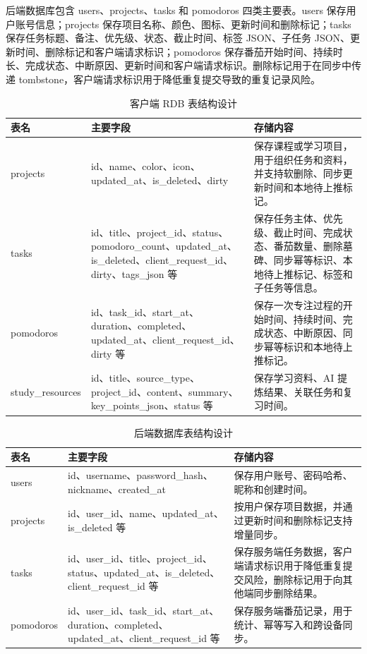 后端数据库包含 users、projects、tasks 和 pomodoros 四类主要表。users 保存用户账号信息；projects 保存项目名称、颜色、图标、更新时间和删除标记；tasks 保存任务标题、备注、优先级、状态、截止时间、标签 JSON、子任务 JSON、更新时间、删除标记和客户端请求标识；pomodoros 保存番茄开始时间、持续时长、完成状态、中断原因、更新时间和客户端请求标识。删除标记用于在同步中传递 tombstone，客户端请求标识用于降低重复提交导致的重复记录风险。

\begin{table}[htbp]
\centering
\caption{客户端 RDB 表结构设计}
\begin{tabularx}{\textwidth}{p{2.6cm}p{3.8cm}X}
\toprule
表名 & 主要字段 & 存储内容 \\
\midrule
projects & id、name、color、icon、updated\_at、is\_deleted、dirty & 保存课程或学习项目，用于组织任务和资料，并支持软删除、同步更新时间和本地待上推标记。 \\
tasks & id、title、project\_id、status、pomodoro\_count、updated\_at、is\_deleted、client\_request\_id、dirty、tags\_json 等 & 保存任务主体、优先级、截止时间、完成状态、番茄数量、删除墓碑、同步幂等标识、本地待上推标记、标签和子任务等信息。 \\
pomodoros & id、task\_id、start\_at、duration、completed、updated\_at、client\_request\_id、dirty 等 & 保存一次专注过程的开始时间、持续时间、完成状态、中断原因、同步幂等标识和本地待上推标记。 \\
study\_resources & id、title、source\_type、project\_id、content、summary、key\_points\_json、status 等 & 保存学习资料、AI 提炼结果、关联任务和复习时间。 \\
\bottomrule
\end{tabularx}
\end{table}

\begin{table}[htbp]
\centering
\caption{后端数据库表结构设计}
\begin{tabularx}{\textwidth}{p{2.4cm}p{4.0cm}X}
\toprule
表名 & 主要字段 & 存储内容 \\
\midrule
users & id、username、password\_hash、nickname、created\_at & 保存用户账号、密码哈希、昵称和创建时间。 \\
projects & id、user\_id、name、updated\_at、is\_deleted 等 & 按用户保存项目数据，并通过更新时间和删除标记支持增量同步。 \\
tasks & id、user\_id、title、project\_id、status、updated\_at、is\_deleted、client\_request\_id 等 & 保存服务端任务数据，客户端请求标识用于降低重复提交风险，删除标记用于向其他端同步删除结果。 \\
pomodoros & id、user\_id、task\_id、start\_at、duration、completed、updated\_at、client\_request\_id 等 & 保存服务端番茄记录，用于统计、幂等写入和跨设备同步。 \\
\bottomrule
\end{tabularx}
\end{table}

